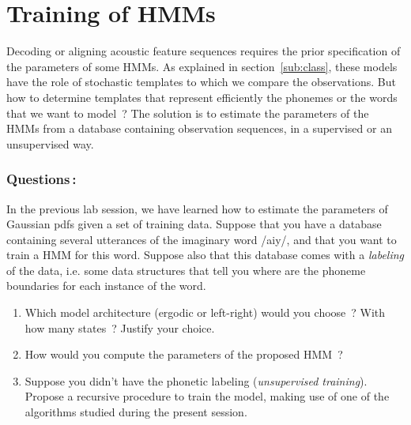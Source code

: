 \documentclass[twoside,a4paper,titlepage]{article}
\begin{document}
\pagebreak
\section{Training of HMMs}
Decoding or aligning acoustic feature sequences requires the prior
specification of the parameters of some HMMs. As explained in
section~\ref{sub:class}, these models have the role of stochastic templates
to which we compare the observations.  But how to determine templates that
represent efficiently the phonemes or the words that we want to model~? The
solution is to estimate the parameters of the HMMs from a database
containing observation sequences, in a supervised or an unsupervised way.

\subsubsection*{Questions\,:}
In the previous lab session, we have learned how to estimate the parameters
of Gaussian pdfs given a set of training data. Suppose that you have a
database containing several utterances of the imaginary word /aiy/, and
that you want to train a HMM for this word. Suppose also that this database
comes with a {\em labeling} of the data, i.e. some data structures that
tell you where are the phoneme boundaries for each instance of the word.
\begin{enumerate}
\item Which model architecture (ergodic or left-right) would you choose~?
With how many states~?  Justify your choice.
\item How would you compute the parameters of the proposed HMM~?
\item Suppose you didn't have the phonetic labeling ({\em unsupervised
training}). Propose a recursive procedure to train the model, making use of
one of the algorithms studied during the present session.
\end{enumerate}
\end{document}
